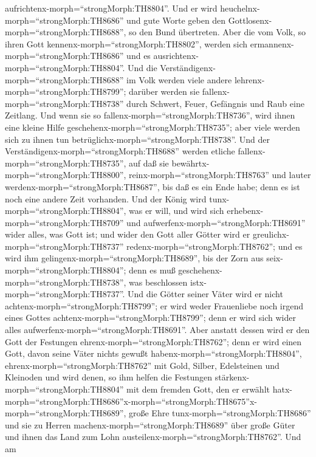 aufrichtenx-morph=``strongMorph:TH8804''.  Und er wird
heuchelnx-morph=``strongMorph:TH8686'' und gute Worte geben den
Gottlosenx-morph=``strongMorph:TH8688'', so den Bund übertreten. Aber
die vom Volk, so ihren Gott kennenx-morph=``strongMorph:TH8802'', werden
sich ermannenx-morph=``strongMorph:TH8686'' und es
ausrichtenx-morph=``strongMorph:TH8804''.  Und die
Verständigenx-morph=``strongMorph:TH8688'' im Volk werden viele andere
lehrenx-morph=``strongMorph:TH8799''; darüber werden sie
fallenx-morph=``strongMorph:TH8738'' durch Schwert, Feuer, Gefängnis und
Raub eine Zeitlang.  Und wenn sie so
fallenx-morph=``strongMorph:TH8736'', wird ihnen eine kleine Hilfe
geschehenx-morph=``strongMorph:TH8735''; aber viele werden sich zu ihnen
tun betrüglichx-morph=``strongMorph:TH8738''.  Und der
Verständigenx-morph=``strongMorph:TH8688'' werden etliche
fallenx-morph=``strongMorph:TH8735'', auf daß sie
bewährtx-morph=``strongMorph:TH8800'',
reinx-morph=``strongMorph:TH8763'' und lauter
werdenx-morph=``strongMorph:TH8687'', bis daß es ein Ende habe; denn es
ist noch eine andere Zeit vorhanden.  Und der König wird
tunx-morph=``strongMorph:TH8804'', was er will, und wird sich
erhebenx-morph=``strongMorph:TH8709'' und
aufwerfenx-morph=``strongMorph:TH8691'' wider alles, was Gott ist; und
wider den Gott aller Götter wird er
greulichx-morph=``strongMorph:TH8737''
redenx-morph=``strongMorph:TH8762''; und es wird ihm
gelingenx-morph=``strongMorph:TH8689'', bis der Zorn aus
seix-morph=``strongMorph:TH8804''; denn es muß
geschehenx-morph=``strongMorph:TH8738'', was beschlossen
istx-morph=``strongMorph:TH8737''.  Und die Götter seiner
Väter wird er nicht achtenx-morph=``strongMorph:TH8799''; er wird weder
Frauenliebe noch irgend eines Gottes
achtenx-morph=``strongMorph:TH8799''; denn er wird sich wider alles
aufwerfenx-morph=``strongMorph:TH8691''.  Aber anstatt
dessen wird er den Gott der Festungen
ehrenx-morph=``strongMorph:TH8762''; denn er wird einen Gott, davon
seine Väter nichts gewußt habenx-morph=``strongMorph:TH8804'',
ehrenx-morph=``strongMorph:TH8762'' mit Gold, Silber, Edelsteinen und
Kleinoden  und wird denen, so ihm helfen die Festungen
stärkenx-morph=``strongMorph:TH8804'' mit dem fremden Gott, den er
erwählt
hatx-morph=``strongMorph:TH8686''\textbar x-morph=``strongMorph:TH8675''x-morph=``strongMorph:TH8689'',
große Ehre tunx-morph=``strongMorph:TH8686'' und sie zu Herren
machenx-morph=``strongMorph:TH8689'' über große Güter und ihnen das Land
zum Lohn austeilenx-morph=``strongMorph:TH8762''.  Und am
